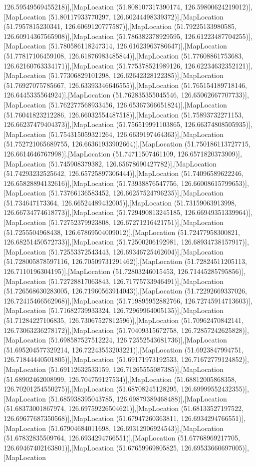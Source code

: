 126.59549569455218)],[MapLocation (51.808107317390174, 126.59800624219012)],[MapLocation (51.80117933770297, 126.60244498339372)],[MapLocation (51.7957815230341, 126.6069120777587)],[MapLocation (51.79225133980585, 126.60914367565908)],[MapLocation (51.786382378929595, 126.61223487704255)],[MapLocation (51.780586118247314, 126.61623963786647)],[MapLocation (51.77817106459108, 126.61876983485844)],[MapLocation (51.77608861753683, 126.62160763334171)],[MapLocation (51.775378521989126, 126.62234632352121)],[MapLocation (51.77306829101298, 126.62642328122385)],[MapLocation (51.76927075785667, 126.63393346646555)],[MapLocation (51.765154189718146, 126.6445335564924)],[MapLocation (51.762835355045546, 126.65062667707733)],[MapLocation (51.762277568933456, 126.65367366651824)],[MapLocation (51.76041823212286, 126.66032554487518)],[MapLocation (51.75893732271153, 126.66237479404373)],[MapLocation (51.756519991103865, 126.66374808505935)],[MapLocation (51.754315059321264, 126.6639197464363)],[MapLocation (51.752721065689755, 126.66361933902664)],[MapLocation (51.750186113727715, 126.6614646767998)],[MapLocation (51.74711507461109, 126.6571820373909)],[MapLocation (51.745908379382, 126.65678690427782)],[MapLocation (51.74293232525642, 126.65725897306444)],[MapLocation (51.74096589622246, 126.65828894132616)],[MapLocation (51.73938876547756, 126.66008615799653)],[MapLocation (51.73766136583452, 126.66257524796235)],[MapLocation (51.734647173364, 126.66524489432005)],[MapLocation (51.73159063913998, 126.66734774618773)],[MapLocation (51.729490813245185, 126.66949351339964)],[MapLocation (51.72752379923808, 126.67271216421751)],[MapLocation (51.7255504968438, 126.67869504009012)],[MapLocation (51.72477958300821, 126.68251450572733)],[MapLocation (51.72500206192981, 126.68934738157917)],[MapLocation (51.72553372543443, 126.69346725462604)],[MapLocation (51.728005878597116, 126.70509731291462)],[MapLocation (51.72824511205113, 126.7110196304195)],[MapLocation (51.72803246015453, 126.71445285795856)],[MapLocation (51.72728817063843, 126.71775733946491)],[MapLocation (51.726568630283005, 126.71960563914043)],[MapLocation (51.72292669337026, 126.72415466562968)],[MapLocation (51.719895952882766, 126.72745914713603)],[MapLocation (51.71682739933324, 126.72969964005135)],[MapLocation (51.71284227106835, 126.73067527812596)],[MapLocation (51.70962470842141, 126.73063236278172)],[MapLocation (51.70409315672758, 126.72857242625828)],[MapLocation (51.698587527512224, 126.72552543681736)],[MapLocation (51.695204577329214, 126.72243553203221)],[MapLocation (51.6923847994751, 126.71844440501805)],[MapLocation (51.69171973192533, 126.71672779124852)],[MapLocation (51.69112632533159, 126.71265555087385)],[MapLocation (51.68902462008999, 126.704759127534)],[MapLocation (51.68812005868358, 126.70201254550275)],[MapLocation (51.68708245128295, 126.69999552432355)],[MapLocation (51.685938395043785, 126.69879389468488)],[MapLocation (51.68373001867974, 126.69759226504621)],[MapLocation (51.68133527197522, 126.69677687350568)],[MapLocation (51.67947260363811, 126.6934294766551)],[MapLocation (51.67904684011698, 126.69312906924543)],[MapLocation (51.67832835509764, 126.6934294766551)],[MapLocation (51.67768969217705, 126.69467402163801)],[MapLocation (51.67659969805825, 126.69533660697005)],[MapLocation 